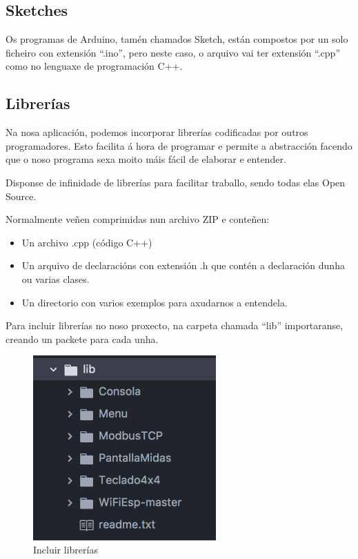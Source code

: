\documentclass[11pt,twoside]{book}
\begin{document}
\subsection{Sketches}

Os programas de Arduino, tamén chamados Sketch, están compostos por un solo ficheiro con extensión ``.ino'', pero neste caso, o arquivo vai ter extensión ``.cpp'' como no lenguaxe de programación C++.

\subsection{Librerías}

Na nosa aplicación, podemos incorporar  librerías codificadas por outros programadores. Esto facilita á hora de programar e permite a abstracción facendo que o noso programa sexa moito máis fácil de elaborar e entender.

Disponse de infinidade de librerías para facilitar traballo, sendo todas elas Open Source.

Normalmente veñen comprimidas nun archivo ZIP e conteñen:
\begin{itemize}
\item Un archivo .cpp (código C++)
\item Un arquivo de declaracións con extensión .h que contén a declaración dunha ou varias clases.
\item Un directorio con varios exemplos para axudarnos a entendela.
\end{itemize}

Para incluir librerías no noso proxecto, na carpeta chamada ``lib'' importaranse, creando un packete para cada unha.

\begin{figure}[H]
	\begin{center}
		\includegraphics[width=7cm]{images/librerias.png}
	\end{center}
	\caption{Incluir librerías}
	\label{fig:LibreriasAtom}
\end{figure}
\end{document}
